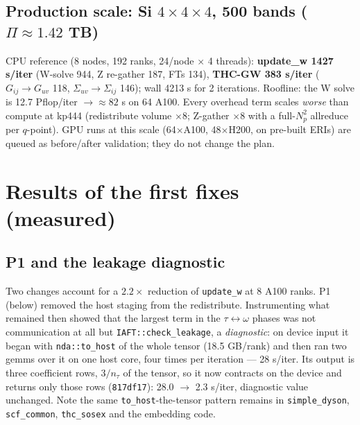 \documentclass[11pt]{article}
\begin{document}
\subsection{Production scale: Si $4{\times}4{\times}4$, 500 bands ($\Pi\approx 1.42$ TB)}
CPU reference (8 nodes, 192 ranks, 24/node $\times$ 4 threads):
\textbf{update\_w 1427 s/iter} (W-solve 944, \textcolor{bad}{Z re-gather 187}, FTs 134),
\textbf{THC-GW 383 s/iter} ($G_{ij}{\rightarrow}G_{uv}$ 118, $\Sigma_{uv}{\rightarrow}\Sigma_{ij}$ 146);
wall 4213 s for 2 iterations. Roofline: the W solve is 12.7 Pflop/iter
$\rightarrow \approx 82$ s on 64 A100. Every overhead term scales \emph{worse} than
compute at kp444 (redistribute volume $\times 8$; Z-gather $\times 8$ with a full-$N_p^2$
allreduce per $q$-point). GPU runs at this scale (64$\times$A100, 48$\times$H200, on
pre-built ERIs) are queued as before/after validation; they do not change the plan.

\section{Results of the first fixes (measured)}
\subsection{P1 and the leakage diagnostic}
Two changes account for a $2.2\times$ reduction of \texttt{update\_w} at 8 A100 ranks.
P1 (below) removed the host staging from the redistribute. Instrumenting what remained
then showed that the largest term in the $\tau\!\leftrightarrow\!\omega$ phases was not
communication at all but \texttt{IAFT::check\_leakage}, a \emph{diagnostic}: on device
input it began with \texttt{nda::to\_host} of the whole tensor (18.5 GB/rank) and then ran
two gemms over it on one host core, four times per iteration --- 28 s/iter. Its output is
three coefficient rows, $3/n_\tau$ of the tensor, so it now contracts on the device and
returns only those rows (\texttt{817df17}): 28.0 $\rightarrow$ 2.3 s/iter, diagnostic
value unchanged. Note the same \texttt{to\_host}-the-tensor pattern remains in
\texttt{simple\_dyson}, \texttt{scf\_common}, \texttt{thc\_sosex} and the embedding code.
\end{document}
